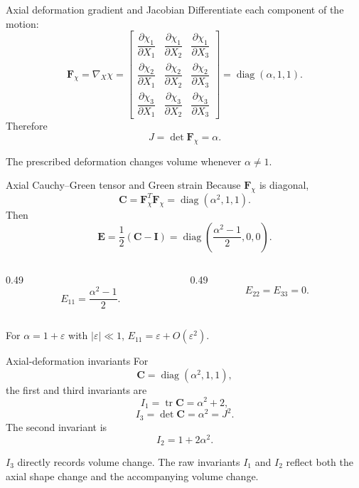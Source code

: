 \documentclass[aspectratio=169,11pt]{beamer}
\newcommand{\I}{\bm{I}}
\newcommand{\Fdef}{\bm{F}_{\chi}}
\newcommand{\Cten}{\bm{C}}
\newcommand{\Eten}{\bm{E}}
\newcommand{\gradX}{\nabla_{\!X}}
\begin{document}
\begin{frame}{Axial deformation gradient and Jacobian}
Differentiate each component of the motion:
\[
  \Fdef
  =
  \gradX\chi
  =
  \begin{bmatrix}
  \dfrac{\partial\chi_1}{\partial X_1}&
  \dfrac{\partial\chi_1}{\partial X_2}&
  \dfrac{\partial\chi_1}{\partial X_3}\\[11pt]
  \dfrac{\partial\chi_2}{\partial X_1}&
  \dfrac{\partial\chi_2}{\partial X_2}&
  \dfrac{\partial\chi_2}{\partial X_3}\\[11pt]
  \dfrac{\partial\chi_3}{\partial X_1}&
  \dfrac{\partial\chi_3}{\partial X_2}&
  \dfrac{\partial\chi_3}{\partial X_3}
  \end{bmatrix}
  =
  \operatorname{diag}(\alpha,1,1).
\]
Therefore
\[
  \boxed{J=\det\Fdef=\alpha}.
\]
\begin{punchbox}
\small
The prescribed deformation changes volume whenever \(\alpha\ne1\).
\end{punchbox}
\end{frame}

\begin{frame}{Axial Cauchy--Green tensor and Green strain}
Because \(\Fdef\) is diagonal,
\[
  \Cten
  =
  \Fdef^T\Fdef
  =
  \operatorname{diag}(\alpha^2,1,1).
\]
Then
\[
  \Eten
  =
  \frac12(\Cten-\I)
  =
  \operatorname{diag}\left(
    \frac{\alpha^2-1}{2},0,0
  \right).
\]
\begin{columns}[T,onlytextwidth]
\begin{column}{0.49\textwidth}
\[
  E_{11}=\frac{\alpha^2-1}{2}.
\]
\end{column}
\begin{column}{0.49\textwidth}
\[
  E_{22}=E_{33}=0.
\]
\end{column}
\end{columns}
\medskip
\begin{punchbox}
\small
For \(\alpha=1+\varepsilon\) with \(|\varepsilon|\ll1\), \(E_{11}=\varepsilon+O(\varepsilon^2)\).
\end{punchbox}
\end{frame}

\begin{frame}{Axial-deformation invariants}
For
\[
  \Cten=\operatorname{diag}(\alpha^2,1,1),
\]
the first and third invariants are
\[
  I_1=\operatorname{tr}\Cten=\alpha^2+2,
\]
\[
  I_3=\det\Cten=\alpha^2=J^2.
\]
The second invariant is
\[
  I_2=1+2\alpha^2.
\]
\begin{punchbox}
\small
\(I_3\) directly records volume change. The raw invariants \(I_1\) and \(I_2\) reflect both the axial shape change and the accompanying volume change.
\end{punchbox}
\end{frame}
\end{document}
